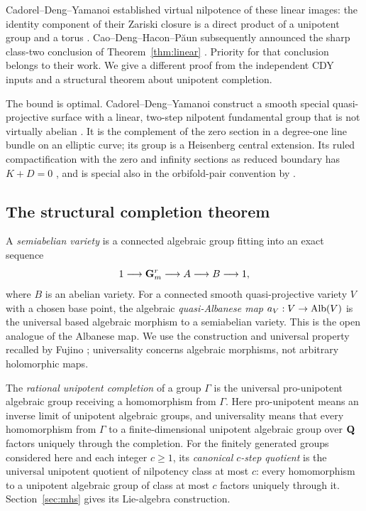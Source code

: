 Cadorel--Deng--Yamanoi established virtual nilpotence of these linear
images: the identity component of their Zariski closure is a direct
product of a unipotent group and a torus
\cite[Theorem A/4.1]{CDY2025}. Cao--Deng--Hacon--P\u aun subsequently
announced the sharp class-two conclusion of Theorem~\ref{thm:linear}
\cite[Theorem A, equivalently Theorem 6.2]{CDHP2026}. Priority for that
conclusion belongs to their work. We give a different proof from the
independent CDY inputs and a structural theorem about unipotent
completion.

The bound is optimal. Cadorel--Deng--Yamanoi construct a smooth special
quasi-projective surface with a linear, two-step nilpotent fundamental
group that is not virtually abelian
\cite[Example 4.25 and Remarks 4.28--4.29]{CDY2025}. It is the complement
of the zero section in a degree-one line bundle on an elliptic curve;
its group is a Heisenberg central extension. Its ruled compactification
with the zero and infinity sections as reduced boundary has $K+D=0$
\cite[Lemma 5.10]{CDY2025}, and is special also in the orbifold-pair
convention by \cite[arXiv version, Theorem 6.7]{Campana2011}.

\subsection{The structural completion theorem}
A \emph{semiabelian variety} is a connected algebraic group fitting into
an exact sequence
\[
 1\longrightarrow\mathbf G_m^r\longrightarrow A\longrightarrow B
 \longrightarrow1,
\]
where $B$ is an abelian variety. For a connected smooth quasi-projective
variety $V$ with a chosen base point, the algebraic
\emph{quasi-Albanese map} $a_V:V\to\operatorname{Alb}(V)$ is the universal based
algebraic morphism to a semiabelian variety. This is the open analogue
of the Albanese map. We use the construction and universal property
recalled by Fujino \cite[Definition 2.18 and Theorem 3.16]{Fujino2024};
universality concerns algebraic morphisms, not arbitrary holomorphic
maps.

The \emph{rational unipotent completion} of a group $\Gamma$ is the
universal pro-unipotent algebraic group receiving a homomorphism from
$\Gamma$. Here pro-unipotent means an inverse limit of unipotent
algebraic groups, and universality means that every homomorphism from
$\Gamma$ to a finite-dimensional unipotent algebraic group over $\mathbf Q$
factors uniquely through the completion. For the finitely generated
groups considered here and each integer $c\geq1$, its
\emph{canonical $c$-step quotient} is the universal unipotent
quotient of nilpotency class at most $c$: every homomorphism to a
unipotent algebraic group of class at most $c$ factors uniquely through
it. Section~\ref{sec:mhs} gives its Lie-algebra construction.

